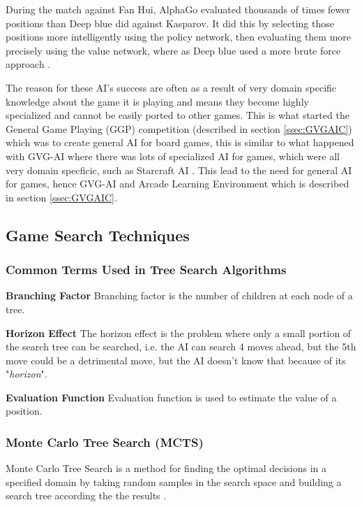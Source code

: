 \documentclass[journal]{IEEEtran}
\begin{document}
		During the match against Fan Hui, AlphaGo evaluated thousands of times fewer positions than Deep blue did against Kasparov. It did this by selecting those positions more intelligently using the policy network, then evaluating them more precisely using the value network, where as Deep blue used a more brute force approach \cite{silver2016mastering, DeepBlue}.

		The reason for these AI's success are often as a result of very domain specific knowledge about the game it is playing and means they become highly specialized and cannot be easily ported to other games. 
		This is what started the General Game Playing (GGP) competition (described in section \ref{ssec:GVGAIC}) which was to create general AI for board games, this is similar to what happened with GVG-AI where there was lots of specialized AI for games, which were all very domain specficic, such as Starcraft AI \cite{ontanon2013survey, hingston2010new}.
		This lead to the need for general AI for games, hence GVG-AI and Arcade Learning Environment which is described in section \ref{ssec:GVGAIC}.
		
	\subsection{Game Search Techniques} \label{ssec:GST}
		\subsubsection{Common Terms Used in Tree Search Algorithms} \label{sssec:Common}

		\textbf{Branching Factor}
			Branching factor is the number of children at each node of a tree.

		\textbf{Horizon Effect}
			The horizon effect is the problem where only a small portion of the search tree can be searched, i.e. the AI can search 4 moves ahead, but the 5th move could be a detrimental move, but the AI doesn't know that because of its "\textit{horizon}".

		\textbf{Evaluation Function}
			Evaluation function is used to estimate the value of a position.

		
		
		\subsubsection{Monte Carlo Tree Search (MCTS) }\label{sssec:MCTS}

		Monte Carlo Tree Search is a method for finding the optimal decisions in a specified domain by taking random samples in the search space and building a search tree according the the results \cite{browne2012survey}. 
\end{document}
